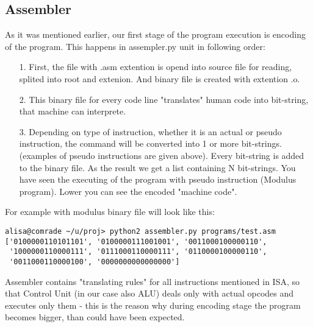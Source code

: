 \documentclass[11pt,a4paper]{article}
\begin{document}
\subsection{Assembler}
As it was mentioned earlier, our first stage of the program execution is encoding of the program. This happens in assempler.py unit in following order:
\begin{enumerate}
	\item[1.] First, the file with .asm extention is opend into source file for reading, splited into root and extenion. And binary file is created with extention .o.
	\item[2.] This binary file for every code line	"translates" human code into bit-string, that machine can interprete.
	\item[3.] Depending on type of instruction, whether it is an actual or pseudo instruction, the command will be converted into 1 or more bit-strings. (examples of pseudo instructions are given above). Every bit-string is added to the binary file. As the result we get a list containing N bit-strings. You have seen the executing of the program with pseudo instruction (Modulus program). Lower you can see the encoded "machine code". 
\end{enumerate}
For example with modulus binary file will look like this:
\begin{verbatim}
alisa@comrade ~/u/proj> python2 assembler.py programs/test.asm
['0100000110101101', '0100000111001001', '0011000100000110',
 '1000000110000111', '0111000110000111', '0110000100000110',
 '0011000110000100', '0000000000000000']
\end{verbatim} 
Assembler contains "translating rules" for all instructions mentioned in ISA, so that Control Unit (in our case also ALU) deals only with actual opcodes and executes only them - this is the reason why during encoding stage the program becomes bigger, than could have been expected.\\
\end{document}
